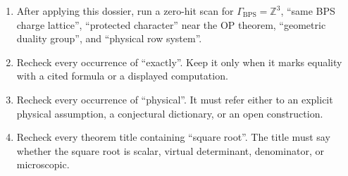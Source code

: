 \begin{enumerate}
\item After applying this dossier, run a zero-hit scan for
\(\Gamma_{\mathrm{BPS}}=\mathbb Z^3\), ``same BPS charge lattice'',
``protected character'' near the OP theorem, ``geometric duality group'',
and ``physical row system''.
\item Recheck every occurrence of ``exactly''.  Keep it only when it
marks equality with a cited formula or a displayed computation.
\item Recheck every occurrence of ``physical''.  It must refer either to
an explicit physical assumption, a conjectural dictionary, or an open
construction.
\item Recheck every theorem title containing ``square root''.  The title
must say whether the square root is scalar, virtual determinant,
denominator, or microscopic.
\end{enumerate}
